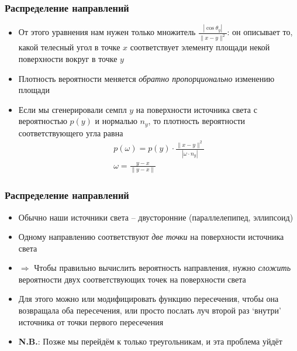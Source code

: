 \documentclass[handout,10pt]{beamer}
\begin{document}
\begin{frame}
\frametitle{Распределение направлений}
\begin{itemize}
\item От этого уравнения нам нужен только множитель \begin{math}\frac{|\cos\theta_y|}{\|x-y\|^2}\end{math}: он описывает то, какой телесный угол в точке \begin{math}x\end{math} соответствует элементу площади некой поверхности вокруг в точке \begin{math}y\end{math}
\pause
\item Плотность вероятности меняется \textit{обратно пропорционально} изменению площади
\pause
\item Если мы сгенерировали семпл \begin{math}y\end{math} на поверхности источника света с вероятностью \begin{math}p(y)\end{math} и нормалью \begin{math}n_y\end{math}, то плотность вероятности соответствующего угла равна
\begin{gather*}
p(\omega) = p(y) \cdot \frac{\|x-y\|^2}{|\omega \cdot n_y|} \\
\omega = \frac{y-x}{\|y-x\|}
\end{gather*}
\end{itemize}
\end{frame}

\begin{frame}
\frametitle{Распределение направлений}
\begin{itemize}
\item Обычно наши источники света -- двусторонние (параллелепипед, эллипсоид)
\pause
\item Одному направлению соответствуют \textit{две точки} на поверхности источника света
\pause
\item \begin{math}\Longrightarrow\end{math} Чтобы правильно вычислить вероятность направления, нужно \textit{сложить} вероятности двух соответствующих точек на поверхности света
\pause
\item Для этого можно или модифицировать функцию пересечения, чтобы она возвращала оба пересечения, или просто послать луч второй раз `внутри' источника от точки первого пересечения
\pause
\item \alert{\textbf{N.B.}}: Позже мы перейдём к только треугольникам, и эта проблема уйдёт
\end{itemize}
\end{frame}
\end{document}
